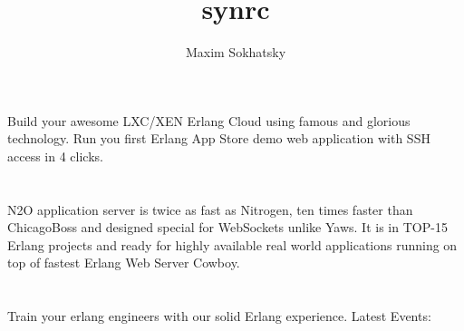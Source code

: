 \documentclass[11pt]{article}
\begin{document}
\title{synrc}
\author{Maxim Sokhatsky}
\section*{}
\paragraph{}
Build your awesome LXC/XEN Erlang Cloud using famous  and glorious  technology.
Run you first Erlang App Store demo web application with SSH access in 4 clicks.

\section*{}
\paragraph{}
N2O application server is twice as fast as Nitrogen, ten times faster than ChicagoBoss and designed special for WebSockets unlike Yaws.
It is in TOP-15 Erlang projects and ready for highly available real world applications running on top of fastest Erlang Web Server Cowboy.

\section*{}
\paragraph{}
Train your erlang engineers with our solid Erlang experience.
Latest Events:
\paragraph{}
\end{document}
